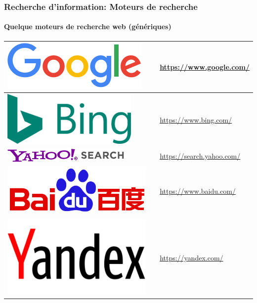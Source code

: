 \documentclass{beamer}
\begin{document}
\begin{frame}
\frametitle{Recherche d'information: Moteurs de recherche}
\framesubtitle{Quelque moteurs de recherche web (génériques)}

\def\arraystretch{0}

\begin{tabular}{L{.3\textwidth}{.8cm}cp{.6\textwidth}}%
	
	\hline
	
	\includegraphics[height=.8cm]{..//img/Bweb02-ri-gmail/google-logo.png} &
	& 
	\url{https://www.google.com/}  \\
	
	\hline
	
	\includegraphics[height=.8cm]{..//img/Bweb02-ri-gmail/bing-logo.png} &
	& 
	\url{https://www.bing.com/} \\
	
	\hline
	
	\includegraphics[height=.4cm]{..//img/Bweb02-ri-gmail/yahoo-logo.png} & 
	& 
	\url{https://search.yahoo.com/} \\
	
	\hline
	
	\includegraphics[height=.8cm]{..//img/Bweb02-ri-gmail/baidu-logo.png} & 
	& 
	\url{https://www.baidu.com/} \\
	
	\hline
	
	\includegraphics[height=.8cm]{..//img/Bweb02-ri-gmail/yandex-logo.png} & 
	& 
	\url{https://yandex.com/} \\
	
	\hline
	
\end{tabular}


\end{frame}
\end{document}
